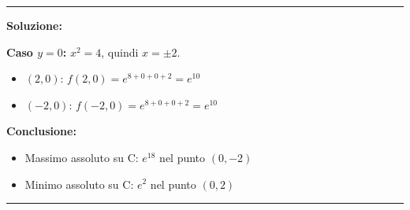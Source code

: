 \documentclass[12pt, a4paper]{article}
\newenvironment{solution}
{\par\noindent\rule{\textwidth}{0.4pt}\par\textbf{Soluzione:}\medskip\par}
{\par\rule{\textwidth}{0.4pt}\par\bigskip}
\begin{document}
\begin{solution}
\textbf{Caso $y = 0$:} $x^2 = 4$, quindi $x = \pm 2$.
\begin{itemize}
    \item $(2, 0)$: $f(2, 0) = e^{8 + 0 + 0 + 2} = e^{10}$
    \item $(-2, 0)$: $f(-2, 0) = e^{8 + 0 + 0 + 2} = e^{10}$
\end{itemize}

\textbf{Conclusione:}
\begin{itemize}
    \item Massimo assoluto su C: $e^{18}$ nel punto $(0, -2)$
    \item Minimo assoluto su C: $e^2$ nel punto $(0, 2)$
\end{itemize}
\end{solution}
\end{document}
